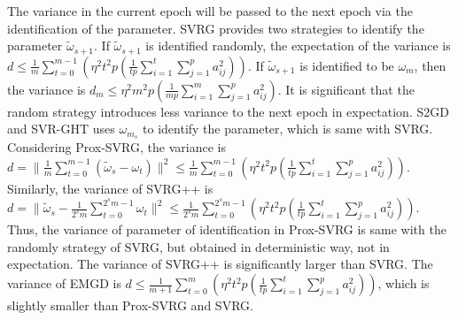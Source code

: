\documentclass[letterpaper]{article}
\begin{document}
The variance in the current epoch will be passed to the next epoch via the identification of the parameter. SVRG provides two strategies to identify the parameter $ \tilde{\omega}_{s+1}$. If $\tilde{\omega}_{s+1}$ is identified randomly, the expectation of the variance is $d \le \frac{1}{m}\sum_{t=0}^{m-1} \left( \eta^2 t^2p  \left( \frac{1}{tp}\sum\limits_{i=1}^t   \sum\limits_{j=1}^p   a_{ij}^2 \right)\right)$. If $ \tilde{\omega}_{s+1}$ is identified to be $\omega_{m}$,  then the variance is $d_{m}\le \eta^2 m^2p  \left( \frac{1}{mp}\sum\limits_{i=1}^m   \sum\limits_{j=1}^p   a_{ij}^2 \right)$. It is significant that the random strategy introduces less variance to the next epoch in expectation. S2GD and SVR-GHT uses $\omega_{m_s}$ to identify the parameter, which is same with SVRG. Considering Prox-SVRG, the variance is $d = \parallel  \frac{1}{m} \sum\limits_{t=0}^{m-1}(\tilde{\omega}_s - \omega_t)  \parallel^2  \le \frac{1}{m}\sum\limits_{t=0}^{m-1} \left(  \eta^2 t^2p  \left( \frac{1}{tp}\sum\limits_{i=1}^t   \sum\limits_{j=1}^p   a_{ij}^2 \right)  \right)$. Similarly, the variance of SVRG++ is $d=\parallel  \tilde{\omega}_s - \frac{1}{2^s m}\sum\limits_{t=0}^{2^s m-1} \omega_t  \parallel^2 \le \frac{1}{2^s m}\sum\limits_{t=0}^{2^s m-1} \left(  \eta^2 t^2p  \left( \frac{1}{tp}\sum\limits_{i=1}^t   \sum\limits_{j=1}^p   a_{ij}^2 \right)  \right)$. Thus, the variance of parameter of identification in Prox-SVRG  is same with the randomly strategy of SVRG, but obtained in deterministic way, not in expectation. The variance of SVRG++ is significantly larger than SVRG. The variance of EMGD is $d \le \frac{1}{m+1}\sum\limits_{t=0}^{m} \left(  \eta^2 t^2p  \left( \frac{1}{tp}\sum\limits_{i=1}^t   \sum\limits_{j=1}^p   a_{ij}^2 \right)  \right)$, which is slightly smaller than Prox-SVRG and SVRG.




 
\end{document}
